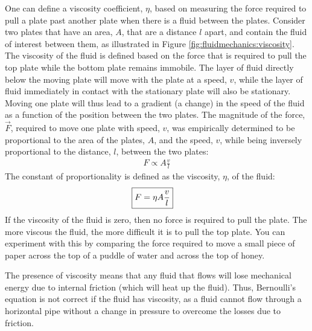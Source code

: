 {{One can define a viscosity coefficient, $\eta$, based on measuring the force required to pull a plate past another plate when there is a fluid between the plates. Consider two plates that have an area, $A$, that are a distance $l$ apart, and contain the fluid of interest between them, as illustrated in Figure \ref{fig:fluidmechanics:viscosity}.
The viscosity of the fluid is defined based on the force that is required to pull the top plate while the bottom plate remains immobile. The layer of fluid directly below the moving plate will move with the plate at a speed, $v$, while the layer of fluid immediately in contact with the stationary plate will also be stationary. Moving one plate will thus lead to a gradient (a change) in the speed of the fluid as a function of the position between the two plates. The magnitude of the force, $\vec F$,  required to move one plate with speed, $v$, was empirically determined to be proportional to the area of the plates, $A$, and the speed, $v$, while being inversely proportional to the distance, $l$, between the two plates:
\begin{align*}
F \propto A\frac{v}{l}
\end{align*}
The constant of proportionality is defined as the viscosity, $\eta$, of the fluid:
\begin{align}
\Aboxed{F = \eta A\frac{v}{l}}
\end{align}
If the viscosity of the fluid is zero, then no force is required to pull the plate. The more viscous the fluid, the more difficult it is to pull the top plate. You can experiment with this by comparing the force required to move a small piece of paper across the top of a puddle of water and across the top of honey.

The presence of viscosity means that any fluid that flows will lose mechanical energy due to internal friction (which will heat up the fluid). Thus, Bernoulli's equation is not correct if the fluid has viscosity, as a fluid cannot flow through a horizontal pipe without a change in pressure to overcome the losses due to friction.

}}
